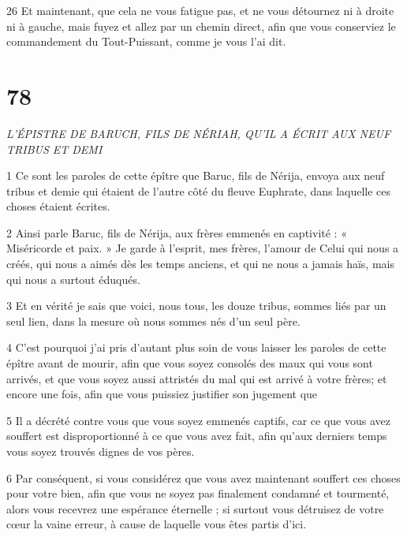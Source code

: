 \par 26 Et maintenant, que cela ne vous fatigue pas, et ne vous détournez ni à droite ni à gauche, mais fuyez et allez par un chemin direct, afin que vous conserviez le commandement du Tout-Puissant, comme je vous l'ai dit.

\chapter{78}

\par \textit{L'ÉPISTRE DE BARUCH, FILS DE NÉRIAH, QU'IL A ÉCRIT AUX NEUF TRIBUS ET DEMI}

\par 1 Ce sont les paroles de cette épître que Baruc, fils de Nérija, envoya aux neuf tribus et demie qui étaient de l'autre côté du fleuve Euphrate, dans laquelle ces choses étaient écrites.

\par 2 Ainsi parle Baruc, fils de Nérija, aux frères emmenés en captivité : « Miséricorde et paix. » Je garde à l'esprit, mes frères, l'amour de Celui qui nous a créés, qui nous a aimés dès les temps anciens, et qui ne nous a jamais haïs, mais qui nous a surtout éduqués.

\par 3 Et en vérité je sais que voici, nous tous, les douze tribus, sommes liés par un seul lien, dans la mesure où nous sommes nés d'un seul père.

\par 4 C'est pourquoi j'ai pris d'autant plus soin de vous laisser les paroles de cette épître avant de mourir, afin que vous soyez consolés des maux qui vous sont arrivés, et que vous soyez aussi attristés du mal qui est arrivé à votre frères; et encore une fois, afin que vous puissiez justifier son jugement que

\par 5 Il a décrété contre vous que vous soyez emmenés captifs, car ce que vous avez souffert est disproportionné à ce que vous avez fait, afin qu'aux derniers temps vous soyez trouvés dignes de vos pères.

\par 6 Par conséquent, si vous considérez que vous avez maintenant souffert ces choses pour votre bien, afin que vous ne soyez pas finalement condamné et tourmenté, alors vous recevrez une espérance éternelle ; si surtout vous détruisez de votre cœur la vaine erreur, à cause de laquelle vous êtes partis d'ici.

